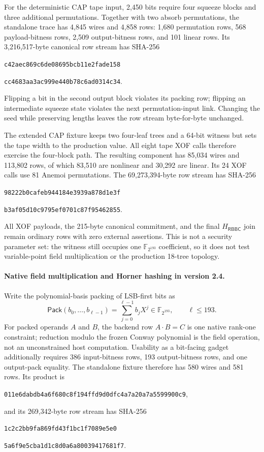 \documentclass[11pt]{article}
\newcommand{\RBBC}{\mathsf{RBBC}}
\begin{document}
For the deterministic CAP tape input, 2,450 bits require four squeeze blocks
and three additional permutations.  Together with two absorb permutations,
the standalone trace has 4,845 wires and 4,858 rows: 1,680 permutation rows,
568 payload-bitness rows, 2,509 output-bitness rows, and 101 linear rows.  Its
3,216,517-byte canonical row stream has SHA-256
\begin{center}
\texttt{c42aec869c6de08695bcb11e2fade158}\par\vspace{-0.2em}
\texttt{cc4683aa3ac999e440b78c6ad0314c34}.
\end{center}
Flipping a bit in the second output block violates its packing row; flipping
an intermediate squeeze state violates the next permutation-input link.
Changing the seed while preserving lengths leaves the row stream byte-for-byte
unchanged.

The extended CAP fixture keeps two four-leaf trees and a 64-bit witness but
sets the tape width to the production value.  All eight tape XOF calls therefore
exercise the four-block path.  The resulting component has 85,034 wires and
113,802 rows, of which 83,510 are nonlinear and 30,292 are linear.  Its 24 XOF
calls use 81 Anemoi permutations.  The 69,273,394-byte row stream has SHA-256
\begin{center}
\texttt{98222b0cafeb944184e3939a878d1e3f}\par\vspace{-0.2em}
\texttt{b3af05d10c9795ef0701c87f95462855}.
\end{center}
All XOF payloads, the 215-byte canonical commitment, and the final
$H_{\RBBC}$ join remain ordinary rows with zero external assertions.  This is
not a security parameter set: the witness still occupies one
$\mathbb F_{2^{193}}$ coefficient, so it does not test variable-point field
multiplication or the production 18-tree topology.

\paragraph{Native field multiplication and Horner hashing in version 2.4.}
Write the polynomial-basis packing of LSB-first bits as
\[
 \mathsf{Pack}(b_0,\ldots,b_{\ell-1})=
 \sum_{j=0}^{\ell-1} b_j X^j\in\mathbb F_{2^{193}},
 \qquad \ell\leq 193.
\]
For packed operands $A$ and $B$, the backend row $A\cdot B=C$ is one native
rank-one constraint; reduction modulo the frozen Conway polynomial is the
field operation, not an unconstrained host computation.  Usability as a
bit-facing gadget additionally requires 386 input-bitness rows, 193
output-bitness rows, and one output-pack equality.  The standalone fixture
therefore has 580 wires and 581 rows.  Its product is
\begin{center}
\texttt{011e6dabdb4a6f680c8f194ffd9d0dfc4a7a20a7a5599900c9},
\end{center}
and its 269,342-byte row stream has SHA-256
\begin{center}
\texttt{1c2c2bb9fa869fd43f1bc1f7089e5e0}\par\vspace{-0.2em}
\texttt{5a6f9e5cba1d1c8d0a6a80039417681f7}.
\end{center}
\end{document}
